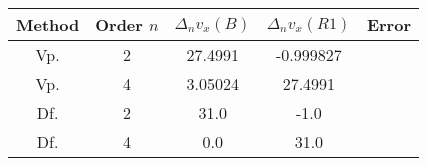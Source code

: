 \begin{tabular}[b]{ccccc}\hline 
 Method & Order $n$&  $\Delta_n v_x(B)$ & $\Delta_n v_x(R1) $& Error \\ \hline
Vp. & 2 & 27.4991 & -0.999827\\  
Vp. & 4 & 3.05024 & 27.4991\\  
Df. & 2 & 31.0 & -1.0\\  
Df. & 4 & 0.0 & 31.0\\ \hline  
\end{tabular}
